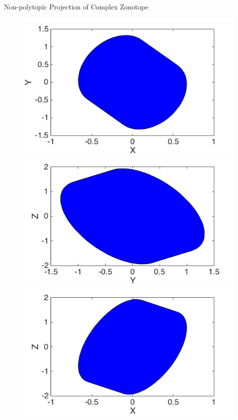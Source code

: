 
\begin{frame}{Non-polytopic Projection of Complex Zonotope}
%
\begin{figure}
\center
\includegraphics[scale=0.3]{figures/CZtopes/xycz.png}
\includegraphics[scale=0.3]{figures/CZtopes/yzcz.png}\\
\includegraphics[scale=0.3]{figures/CZtopes/xzcz.png}
\end{figure}
%
\end{frame}


